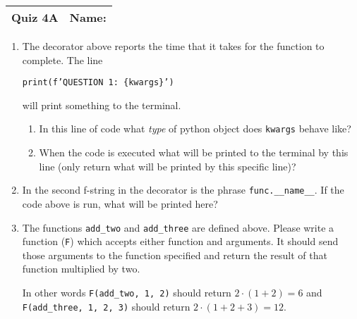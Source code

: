 \documentclass[11pt]{article}
\begin{document}
\clearpage

\begin{tabularx}{\textwidth}{l|X}
\textbf{Quiz 4A} &   \textbf{Name: } \\
\hline
\end{tabularx}

\vspace{1cm}

\begin{enumerate}
\item The decorator above reports the time that it takes for the function to complete. The line 

\texttt{print(f'QUESTION 1: \{kwargs\}')} 

will print something to the terminal. 
	\begin{enumerate} 
		\item In this line of code what \emph{type} of python object does \texttt{kwargs} behave like?
		\vspace{2.5cm}
		\item When the code is executed what will be printed to the terminal by this line (only return what will be printed by this specific line)?
		\vspace{2.5cm}
	\end{enumerate}
\item In the second f-string in the decorator is the phrase \texttt{func.\_\_name\_\_}. If the code above is run, what will be printed here?
		\vspace{2.5cm}

\item The functions \texttt{add\_two} and \texttt{add\_three} are defined above. Please write a function (\texttt{F}) which accepts either function and arguments. It should send those arguments to the function specified and return the result of that function multiplied by two. 

In other words \texttt{F(add\_two, 1, 2)} should return $2 \cdot (1 + 2) = 6$ and \texttt{F(add\_three, 1, 2, 3)} should return $2 \cdot (1 + 2 + 3) = 12$. 

	\vspace{3.5cm}
	
	 
\end{enumerate}
\end{document}
